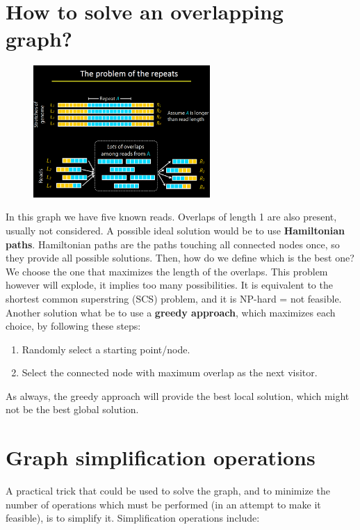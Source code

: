 \section{How to solve an overlapping graph?}

\begin{figure}[h]
\centering
\includegraphics[width=0.6\textwidth]{Repeats.png}
\caption{}
\end{figure}

In this graph we have five known reads. Overlaps of length 1 are also present, usually not considered.
A possible ideal solution would be to use \textbf{Hamiltonian paths}. 
Hamiltonian paths are the paths touching all connected nodes once, so they provide all possible solutions. Then, how do we define which is the best one? We choose the one that maximizes the length of the overlaps. 
This problem however will explode, it implies too many possibilities. It is equivalent to the shortest common superstring (SCS) problem, and it is NP-hard = not feasible.
Another solution what be to use a \textbf{greedy approach}, which maximizes each choice, by following these steps:

\begin{enumerate}
    \item Randomly select a starting point/node.
    \item Select the connected node with maximum overlap as the next visitor.
\end{enumerate}

As always, the greedy approach will provide the best local solution, which might not be the best global solution.

\section{Graph simplification operations}

A practical trick that could be used to solve the graph, and to minimize the number of operations which must be performed (in an attempt to make it feasible), is to simplify it.
Simplification operations include:

